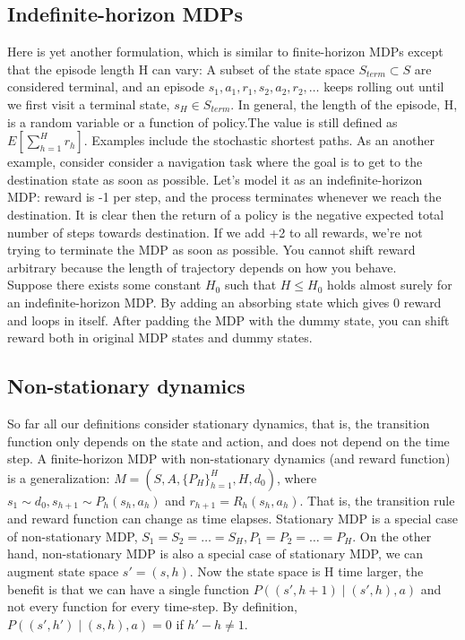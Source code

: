 \documentclass{report}
\begin{document}
\subsection{Indefinite-horizon MDPs}
Here is yet another formulation, which is similar to finite-horizon MDPs except that the episode length H can vary: A subset of the state space $S_{term} \subset S$ are considered terminal, and an episode $s_1,a_1,r_1,s_2,a_2,r_2,\hdots$ keeps rolling out until we first visit a terminal state, $s_H \in S_{term}$. In general, the length of the episode, H, is a random variable or a function of policy.The value is still defined as $E[\sum_{h=1}^{H}r_h]$. Examples include the stochastic shortest paths. As an another example, consider  consider a navigation task where the goal is to get to the destination state as soon as possible. Let’s model it as an indefinite-horizon MDP: reward is -1 per step, and the process terminates whenever we reach the destination. It is clear then the return of a policy is the negative expected total number of steps towards destination. If we add +2 to all rewards, we're not trying to terminate the MDP as soon as possible.
You cannot shift reward arbitrary because the length of trajectory depends on how you behave. \\
Suppose there exists some constant $H_0$ such that $H \leq H_0$ holds almost surely for an indefinite-horizon MDP. By adding an absorbing state which gives 0 reward and loops in itself. After padding the MDP with the dummy state, you can shift reward both in original MDP states and dummy states.

\subsection{Non-stationary dynamics}
So far all our definitions consider stationary dynamics, that is, the transition function only depends on the state and action, and does not depend on the time step. A finite-horizon MDP with non-stationary dynamics (and reward function) is a generalization: $M=(S,A,\{P_H\}_{h=1}^H,H,d_0)$, where $s_1\sim d_0,s_{h+1}\sim P_h(s_h,a_h)$ and $r_{h+1}=R_h(s_h,a_h)$. That is, the transition rule and reward function can change as time elapses. Stationary MDP is a special case of non-stationary MDP, $S_1=S_2=\hdots=S_H, P_1=P_2=\hdots=P_H$. On the other hand, non-stationary MDP is also a special case of stationary MDP, we can augment state space $s'=(s,h)$. Now the state space is H time larger, the benefit is that we can have a single function $P((s',h+1)\mid (s',h),a)$ and not every function for every time-step. By definition, $P((s',h')\mid (s,h),a)=0$ if $h'-h \neq 1$.
\end{document}
